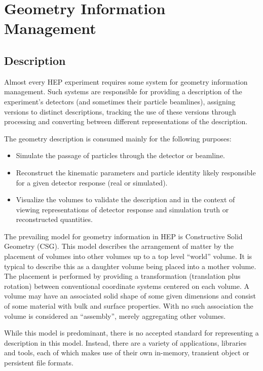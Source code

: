 \section{Geometry Information Management}


\subsection{Description}

Almost every HEP experiment requires some system for geometry
information management.  Such systems are responsible for providing a
description of the experiment's detectors (and sometimes their
particle beamlines), assigning versions to distinct descriptions,
tracking the use of these versions through processing and converting
between different representations of the description.  

The geometry description is consumed mainly for the following
purposes:

\begin{itemize}
\item Simulate the passage of particles through the detector or
  beamline.  
\item Reconstruct the kinematic parameters and particle identity
  likely responsible for a given detector response (real or
  simulated).
\item Visualize the volumes to validate the description and in the
  context of viewing representations of detector response and
  simulation truth or reconstructed quantities.
\end{itemize}

The prevailing model for geometry information in HEP is Constructive
Solid Geometry (CSG).  This model describes the arrangement of matter
by the placement of volumes into other volumes up to a top level
``world'' volume.  It is typical to describe this as a daughter volume
being placed into a mother volume.  The placement is performed by
providing a transformation (translation plus rotation) between
conventional coordinate systems centered on each volume.  A volume may have
an associated solid shape of some given dimensions and consist of some
material with bulk and surface properties.  With no such association
the volume is considered an ``assembly'', merely aggregating other
volumes.

While this model is predominant, there is no accepted standard for
representing a description in this model.  Instead, there are a
variety of applications, libraries and tools, each of which makes use
of their own in-memory, transient object or persistent file formats.  

